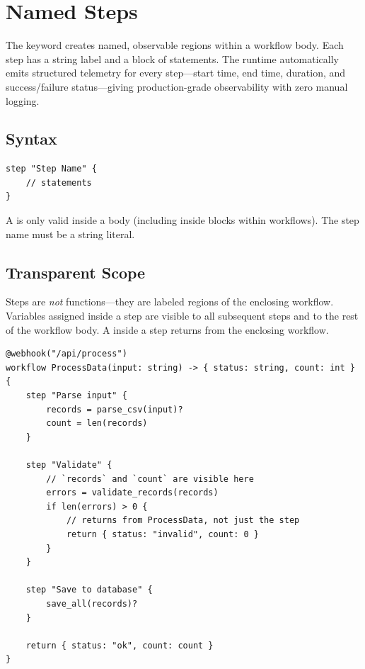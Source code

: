 \section{Named Steps}
\label{sec:named-steps}

The  keyword creates named, observable regions within a workflow body. Each step has a string label and a block of statements. The runtime automatically emits structured telemetry for every step---start time, end time, duration, and success/failure status---giving production-grade observability with zero manual logging.

\subsection{Syntax}

\begin{lstlisting}
step "Step Name" {
    // statements
}
\end{lstlisting}

A  is only valid inside a  body (including inside  blocks within workflows). The step name must be a string literal.

\subsection{Transparent Scope}

Steps are \emph{not} functions---they are labeled regions of the enclosing workflow. Variables assigned inside a step are visible to all subsequent steps and to the rest of the workflow body. A  inside a step returns from the enclosing workflow.

\begin{lstlisting}
@webhook("/api/process")
workflow ProcessData(input: string) -> { status: string, count: int } {
    step "Parse input" {
        records = parse_csv(input)?
        count = len(records)
    }

    step "Validate" {
        // `records` and `count` are visible here
        errors = validate_records(records)
        if len(errors) > 0 {
            // returns from ProcessData, not just the step
            return { status: "invalid", count: 0 }
        }
    }

    step "Save to database" {
        save_all(records)?
    }

    return { status: "ok", count: count }
}
\end{lstlisting}

